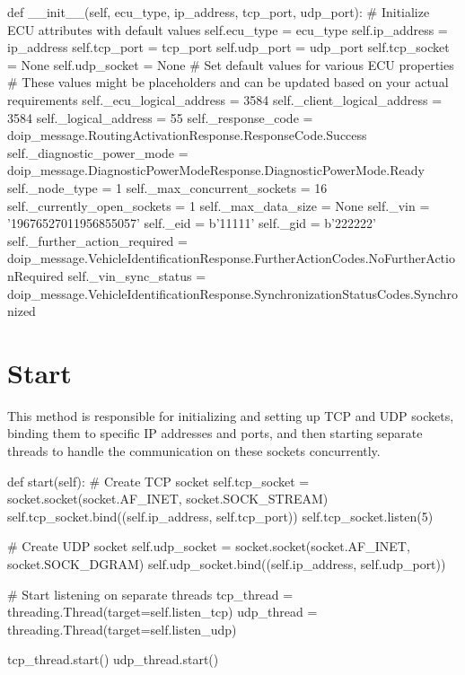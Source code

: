 \begin{pythoncode}
   def __init__(self, ecu_type, ip_address, tcp_port, udp_port):
      # Initialize ECU attributes with default values
      self.ecu_type = ecu_type
      self.ip_address = ip_address
      self.tcp_port = tcp_port
      self.udp_port = udp_port
      self.tcp_socket = None
      self.udp_socket = None
      # Set default values for various ECU properties
      # These values might be placeholders and can be updated based on your actual requirements
      self._ecu_logical_address = 3584
      self._client_logical_address = 3584
      self._logical_address = 55
      self._response_code = doip_message.RoutingActivationResponse.ResponseCode.Success
      self._diagnostic_power_mode = doip_message.DiagnosticPowerModeResponse.DiagnosticPowerMode.Ready
      self._node_type = 1
      self._max_concurrent_sockets = 16
      self._currently_open_sockets = 1
      self._max_data_size = None
      self._vin = '19676527011956855057'
      self._eid = b'11111'
      self._gid = b'222222'
      self._further_action_required = doip_message.VehicleIdentificationResponse.FurtherActionCodes.NoFurtherActionRequired
      self._vin_sync_status = doip_message.VehicleIdentificationResponse.SynchronizationStatusCodes.Synchronized
\end{pythoncode}

\newpage

\section{Start}

This method is responsible for initializing and setting up TCP and UDP sockets, binding them to specific IP addresses and ports, and then starting separate threads to handle the communication on these sockets concurrently.

\begin{pythoncode}
   def start(self):
      # Create TCP socket
      self.tcp_socket = socket.socket(socket.AF_INET, socket.SOCK_STREAM)
      self.tcp_socket.bind((self.ip_address, self.tcp_port))
      self.tcp_socket.listen(5)

      # Create UDP socket
      self.udp_socket = socket.socket(socket.AF_INET, socket.SOCK_DGRAM)
      self.udp_socket.bind((self.ip_address, self.udp_port))

      # Start listening on separate threads
      tcp_thread = threading.Thread(target=self.listen_tcp)
      udp_thread = threading.Thread(target=self.listen_udp)

      tcp_thread.start()
      udp_thread.start()
\end{pythoncode}

